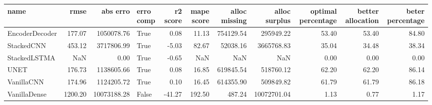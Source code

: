 \begin{tabular}{lrrlrrrrrrr}
\toprule
name & rmse & abs erro & erro comp & r2 score & mape score & alloc missing & alloc surplus & optimal percentage & better allocation & beter percentage \\
\midrule
EncoderDecoder & 177.07 & 1050078.76 & True & 0.08 & 11.13 & 754129.54 & 295949.22 & 53.40 & 53.40 & 84.80 \\
StackedCNN & 453.12 & 3717806.99 & True & -5.03 & 82.67 & 52038.16 & 3665768.83 & 35.04 & 34.48 & 38.34 \\
StackedLSTMA & NaN & 0.00 & True & -0.65 & NaN & NaN & NaN & 0.00 & 0.00 & 0.00 \\
UNET & 176.73 & 1138605.66 & True & 0.08 & 16.85 & 619845.54 & 518760.12 & 62.20 & 62.20 & 86.14 \\
VanillaCNN & 174.96 & 1124205.72 & True & 0.10 & 16.45 & 614355.90 & 509849.82 & 61.79 & 61.79 & 86.18 \\
VanillaDense & 1200.20 & 10073188.28 & False & -41.27 & 192.50 & 487.24 & 10072701.04 & 1.13 & 0.77 & 1.17 \\
\bottomrule
\end{tabular}
